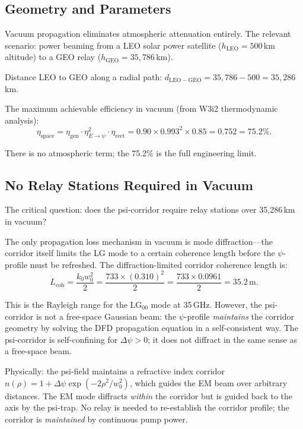 \documentclass[aps,prd,twocolumn,superscriptaddress]{revtex4-2}
\begin{document}
\subsection{Geometry and Parameters}

Vacuum propagation eliminates atmospheric attenuation entirely.
The relevant scenario: power beaming from a LEO solar power satellite
($h_\mathrm{LEO} = 500$\,km altitude) to a GEO relay ($h_\mathrm{GEO}
= 35{,}786$\,km).

Distance LEO to GEO along a radial path:
$d_\mathrm{LEO-GEO} = 35{,}786 - 500 = 35{,}286$\,km.

The maximum achievable efficiency in vacuum (from W3i2 thermodynamic analysis):
\begin{equation}
\eta_\mathrm{space} = \eta_\mathrm{gen}\cdot\eta_{E\to\psi}^2\cdot\eta_\mathrm{rect}
= 0.90\times0.993^2\times0.85 = 0.752 = 75.2\%.
\label{eq:eta_space}
\end{equation}

There is no atmospheric term; the 75.2\% is the full engineering limit.

\subsection{No Relay Stations Required in Vacuum}

The critical question: does the psi-corridor require relay stations over
35,286\,km in vacuum?

The only propagation loss mechanism in vacuum is mode diffraction---the
corridor itself limits the LG mode to a certain coherence length before
the $\psi$-profile must be refreshed.  The diffraction-limited corridor
coherence length is:
\begin{equation}
L_\mathrm{coh} = \frac{k_0 w_0^2}{2} = \frac{733\times(0.310)^2}{2}
= \frac{733\times0.0961}{2} = 35.2\,\mathrm{m}.
\label{eq:L_coh_35GHz}
\end{equation}

This is the Rayleigh range for the LG$_{00}$ mode at 35\,GHz.  However,
the psi-corridor is not a free-space Gaussian beam: the $\psi$-profile
\emph{maintains} the corridor geometry by solving the DFD propagation
equation in a self-consistent way.  The psi-corridor is self-confining
for $\Delta\psi > 0$; it does not diffract in the same sense as a
free-space beam.

Physically: the psi-field maintains a refractive index corridor
$n(\rho) = 1 + \Delta\psi\exp(-2\rho^2/w_0^2)$, which guides the
EM beam over arbitrary distances.  The EM mode diffracts \emph{within}
the corridor but is guided back to the axis by the psi-trap.  No relay
is needed to re-establish the corridor profile; the corridor is
\emph{maintained} by continuous pump power.
\end{document}
